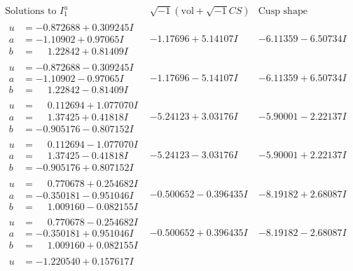 \documentclass[1p]{elsarticle_modified}
\theoremstyle{definition}
\newcommand{\I}{\sqrt{-1}}
\begin{document}
$$\begin{array}{c|c|c}  
\text{Solutions to }I^u_{1}& \I (\text{vol} + \sqrt{-1}CS) & \text{Cusp shape}\\
 \hline 
\begin{aligned}
u &= -0.872688 + 0.309245 I \\
a &= -1.10902 + 0.97065 I \\
b &= \phantom{-}1.22842 + 0.81409 I\end{aligned}
 & -1.17696 + 5.14107 I & -6.11359 - 6.50734 I \\ \hline\begin{aligned}
u &= -0.872688 - 0.309245 I \\
a &= -1.10902 - 0.97065 I \\
b &= \phantom{-}1.22842 - 0.81409 I\end{aligned}
 & -1.17696 - 5.14107 I & -6.11359 + 6.50734 I \\ \hline\begin{aligned}
u &= \phantom{-}0.112694 + 1.077070 I \\
a &= \phantom{-}1.37425 + 0.41818 I \\
b &= -0.905176 - 0.807152 I\end{aligned}
 & -5.24123 + 3.03176 I & -5.90001 - 2.22137 I \\ \hline\begin{aligned}
u &= \phantom{-}0.112694 - 1.077070 I \\
a &= \phantom{-}1.37425 - 0.41818 I \\
b &= -0.905176 + 0.807152 I\end{aligned}
 & -5.24123 - 3.03176 I & -5.90001 + 2.22137 I \\ \hline\begin{aligned}
u &= \phantom{-}0.770678 + 0.254682 I \\
a &= -0.350181 - 0.951046 I \\
b &= \phantom{-}1.009160 - 0.082155 I\end{aligned}
 & -0.500652 - 0.396435 I & -8.19182 + 2.68087 I \\ \hline\begin{aligned}
u &= \phantom{-}0.770678 - 0.254682 I \\
a &= -0.350181 + 0.951046 I \\
b &= \phantom{-}1.009160 + 0.082155 I\end{aligned}
 & -0.500652 + 0.396435 I & -8.19182 - 2.68087 I \\ \hline\begin{aligned}
u &= -1.220540 + 0.157617 I \\

\end{aligned}
\end{array}$$
\end{document}
